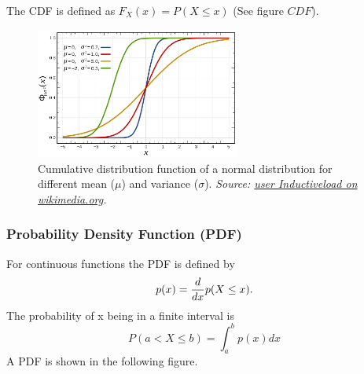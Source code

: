 \documentclass[
]{book}
\begin{document}
The CDF is defined as \(F_X(x) = P(X \leq x)\) (See figure
\protect\hyperlink{CDF}{\(CDF\)}).

\begin{figure}
\hypertarget{CDF}{%
\centering
\includegraphics[width=0.6\textwidth,height=\textheight]{./figures/Normal_Distribution_CDF.png}
\caption{Cumulative distribution function of a normal distribution for
different mean (\(\mu\)) and variance (\(\sigma\)). \emph{Source: \href{https://commons.wikimedia.org/wiki/File:Normal_Distribution_CDF.svg}{user
Inductiveload on
wikimedia.org}.}}\label{CDF}
}
\end{figure}

\hypertarget{probability-density-function-pdf}{%
\subsubsection{Probability Density Function (PDF)}\label{probability-density-function-pdf}}

For continuous functions the PDF is defined by
\[p(x) =  {d \over dx} p(X \leq x).\] The probability of x being in a
finite interval is \[P(a < X \leq b) = \int_a^b p(x) dx\] A PDF is shown
in the following figure.
\end{document}
